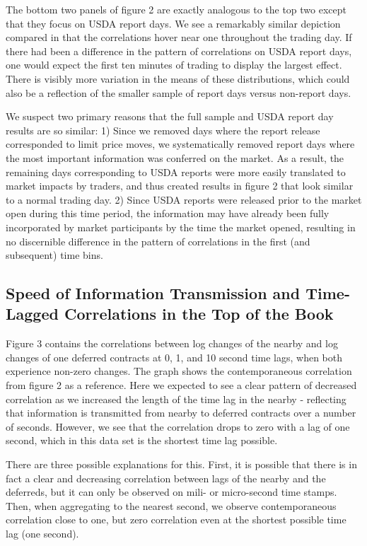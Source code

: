 \documentclass[review,12pt]{elsarticle}
\begin{document}
\begin{linenumbers}
The bottom two panels of figure 2 are exactly analogous to the top two
except that they focus on USDA report days. We see a remarkably similar
depiction compared in that the correlations hover near one throughout
the trading day. If there had been a difference in the pattern of
correlations on USDA report days, one would expect the first ten minutes
of trading to display the largest effect. There is visibly more
variation in the means of these distributions, which could also be a
reflection of the smaller sample of report days versus non-report days.

We suspect two primary reasons that the full sample and USDA report day
results are so similar: 1) Since we removed days where the report
release corresponded to limit price moves, we systematically removed
report days where the most important information was conferred on the
market. As a result, the remaining days corresponding to USDA reports
were more easily translated to market impacts by traders, and thus
created results in figure 2 that look similar to a normal trading day.
2) Since USDA reports were released prior to the market open during this
time period, the information may have already been fully incorporated by
market participants by the time the market opened, resulting in no
discernible difference in the pattern of correlations in the first (and
subsequent) time bins.

\subsection{Speed of Information Transmission and Time-Lagged
Correlations in the Top of the
Book}\label{speed-of-information-transmission-and-time-lagged-correlations-in-the-top-of-the-book-1}

Figure 3 contains the correlations between log changes of the nearby and
log changes of one deferred contracts at 0, 1, and 10 second time lags,
when both experience non-zero changes. The graph shows the
contemporaneous correlation from figure 2 as a reference. Here we
expected to see a clear pattern of decreased correlation as we increased
the length of the time lag in the nearby - reflecting that information
is transmitted from nearby to deferred contracts over a number of
seconds. However, we see that the correlation drops to zero with a lag
of one second, which in this data set is the shortest time lag possible.

There are three possible explanations for this. First, it is possible
that there is in fact a clear and decreasing correlation between lags of
the nearby and the deferreds, but it can only be observed on mili- or
micro-second time stamps. Then, when aggregating to the nearest second,
we observe contemporaneous correlation close to one, but zero
correlation even at the shortest possible time lag (one second).


\end{linenumbers}
\end{document}
